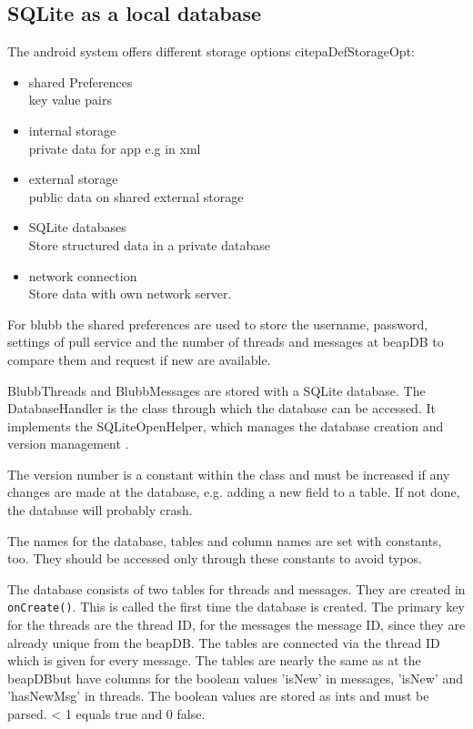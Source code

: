 \documentclass[12pt,a4paper,oneside]{report}
\newcommand{\appname}{blubb}
\newcommand{\beapDB}{beapDB}
\newcommand{\code}[1]{\lstinline{#1}}
\begin{document}
\subsection{SQLite as a local database}

The android system offers different storage options citep{aDefStorageOpt}:
\begin{itemize}
\item{shared Preferences \\key value pairs}
\item{internal storage \\private data for app e.g in xml}
\item{external storage \\public data on shared external storage}
\item{SQLite databases \\Store structured data in a private database}
\item{network connection \\Store data with own network server.}
\end{itemize}
 
For \appname{} the shared preferences are used to store the username, password, settings of pull service and the number of threads and messages at \beapDB{} to compare them and request if new are available.

BlubbThreads and BlubbMessages are stored with a SQLite database. 
The DatabaseHandler is the class through which the database can be accessed. It implements the SQLiteOpenHelper, which manages the database creation and version management \citep{aDefSQLiteOpenHelper}.

The version number is a constant within the class and must be increased if any changes are made at the database, e.g. adding a new field to a table. If not done, the database will probably crash.


The names for the database, tables and column names are set with constants, too. They should be accessed only through these constants to avoid typos. 


The database consists of two tables for threads and messages.
They are created in \code{onCreate()}. This is called the first time the database is created. The primary key for the threads are the thread ID, for the messages the message ID, since they are already unique from the \beapDB{}. The tables are connected via the thread ID which is given for every message.
The tables are nearly the same as at the \beapDB but have columns for the boolean values 'isNew' in messages, 'isNew' and 'hasNewMsg' in threads. The boolean values are stored as ints and must be parsed. < 1 equals true and 0 false. 
\end{document}
